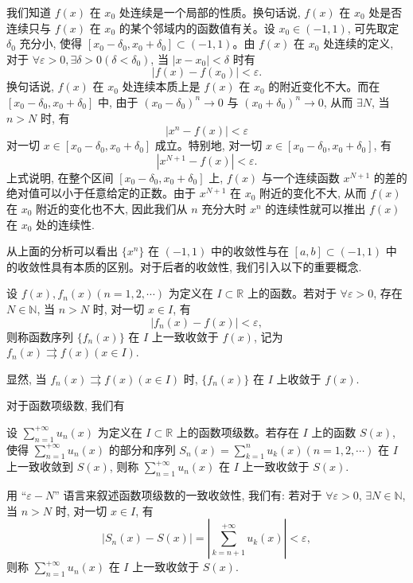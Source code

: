 我们知道 $f(x)$ 在 $x_0$ 处连续是一个局部的性质。换句话说, $f(x)$ 在 $x_0$ 处是否连续只与 $f(x)$ 在 $x_0$ 的某个邻域内的函数值有关。设 $x_0\in(-1,1)$, 可先取定 $\delta_0$ 充分小, 使得 $[x_0-\delta_0,x_0+\delta_0]\subset(-1,1)$。由 $f(x)$ 在 $x_0$ 处连续的定义, 对于 $\forall\varepsilon>0,\exists\delta>0(\delta<\delta_0)$, 当 $|x-x_0|<\delta$ 时有
\[
  |f(x)-f(x_0)|<\varepsilon.
\]
换句话说, $f(x)$ 在 $x_0$ 处连续本质上是 $f(x)$ 在 $x_0$ 的附近变化不大。而在 $[x_0-\delta_0,x_0+\delta_0]$ 中, 由于 $(x_0-\delta_0)^n\to0$ 与 $(x_0+\delta_0)^n\to0$, 从而 $\exists N$, 当 $n>N$ 时, 有
\[
  |x^n-f(x)|<\varepsilon
\]
对一切 $x\in[x_0-\delta_0,x_0+\delta_0]$ 成立。特别地, 对一切 $x\in[x_0-\delta_0,x_0+\delta_0]$, 有
\[
  |x^{N+1}-f(x)|<\varepsilon.
\]
上式说明, 在整个区间 $[x_0-\delta_0,x_0+\delta_0]$ 上, $f(x)$ 与一个连续函数 $x^{N+1}$ 的差的绝对值可以小于任意给定的正数。由于 $x^{N+1}$ 在 $x_0$ 附近的变化不大, 从而 $f(x)$ 在 $x_0$ 附近的变化也不大, 因此我们从 $n$ 充分大时 $x^n$ 的连续性就可以推出 $f(x)$ 在 $x_0$ 处的连续性.

从上面的分析可以看出 $\{x^n\}$ 在 $(-1,1)$ 中的收敛性与在 $[a,b]\subset(-1,1)$ 中的收敛性具有本质的区别。对于后者的收敛性, 我们引入以下的重要概念.

\begin{definition}\label{definition:ma-10-2-1}
设 $f(x),f_n(x)(n=1,2,\cdots)$ 为定义在 $I\subset\mathbb R$ 上的函数。若对于 $\forall\varepsilon>0$, 存在 $N\in\mathbb N$, 当 $n>N$ 时, 对一切 $x\in I$, 有
\[
  |f_n(x)-f(x)|<\varepsilon,
\]
则称函数序列 $\{f_n(x)\}$ 在 $I$ 上一致收敛于 $f(x)$, 记为 $f_n(x)\rightrightarrows f(x)(x\in I)$.
\end{definition}

显然, 当 $f_n(x)\rightrightarrows f(x)(x\in I)$ 时, $\{f_n(x)\}$ 在 $I$ 上收敛于 $f(x)$.

对于函数项级数, 我们有

\begin{definition}\label{definition:ma-10-2-2}
设 $\sum\limits_{n=1}^{+\infty}u_n(x)$ 为定义在 $I\subset\mathbb R$ 上的函数项级数。若存在 $I$ 上的函数 $S(x)$, 使得 $\sum\limits_{n=1}^{+\infty}u_n(x)$ 的部分和序列 $S_n(x)=\sum\limits_{k=1}^n u_k(x)(n=1,2,\cdots)$ 在 $I$ 上一致收敛到 $S(x)$, 则称 $\sum\limits_{n=1}^{+\infty}u_n(x)$ 在 $I$ 上一致收敛于 $S(x)$.
\end{definition}

用 ``$\varepsilon-N$'' 语言来叙述函数项级数的一致收敛性, 我们有: 若对于 $\forall\varepsilon>0$, $\exists N\in\mathbb N$, 当 $n>N$ 时, 对一切 $x\in I$, 有
\[
  |S_n(x)-S(x)|=\left|\sum_{k=n+1}^{+\infty}u_k(x)\right|<\varepsilon,
\]
则称 $\sum\limits_{n=1}^{+\infty}u_n(x)$ 在 $I$ 上一致收敛于 $S(x)$.

